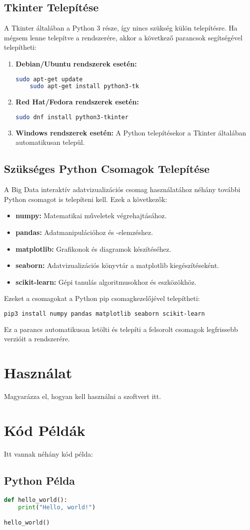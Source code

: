 \documentclass{article}
\begin{document}
\subsection{Tkinter Telepítése}
A Tkinter általában a Python 3 része, így nincs szükség külön telepítésre. Ha mégsem lenne telepítve a rendszerére, akkor a következő parancsok segítségével telepítheti:
\begin{enumerate}
    \item \textbf{Debian/Ubuntu rendszerek esetén:}
    \begin{lstlisting}[language=bash]
    sudo apt-get update
    sudo apt-get install python3-tk
    \end{lstlisting}
    \item \textbf{Red Hat/Fedora rendszerek esetén:}
    \begin{lstlisting}[language=bash]
    sudo dnf install python3-tkinter
    \end{lstlisting}
    \item \textbf{Windows rendszerek esetén:}
    A Python telepítésekor a Tkinter általában automatikusan települ.
\end{enumerate}

\subsection{Szükséges Python Csomagok Telepítése}
A Big Data interaktív adatvizualizációs csomag használatához néhány további Python csomagot is telepíteni kell. Ezek a következők:
\begin{itemize}
    \item \textbf{numpy:} Matematikai műveletek végrehajtásához.
    \item \textbf{pandas:} Adatmanipulációhoz és -elemzéshez.
    \item \textbf{matplotlib:} Grafikonok és diagramok készítéséhez.
    \item \textbf{seaborn:} Adatvizualizációs könyvtár a matplotlib kiegészítéseként.
    \item \textbf{scikit-learn:} Gépi tanulás algoritmusokhoz és eszközökhöz.
\end{itemize}
Ezeket a csomagokat a Python pip csomagkezelőjével telepítheti:
\begin{lstlisting}[language=bash]
pip3 install numpy pandas matplotlib seaborn scikit-learn
\end{lstlisting}
Ez a parancs automatikusan letölti és telepíti a felsorolt csomagok legfrissebb verzióit a rendszerére.

\section{Használat}
Magyarázza el, hogyan kell használni a szoftvert itt.

\section{Kód Példák}
Itt vannak néhány kód példa:

\subsection{Python Példa}
\begin{lstlisting}[language=Python, caption=Python Példa]
def hello_world():
    print("Hello, world!")

hello_world()
\end{lstlisting}
\end{document}
